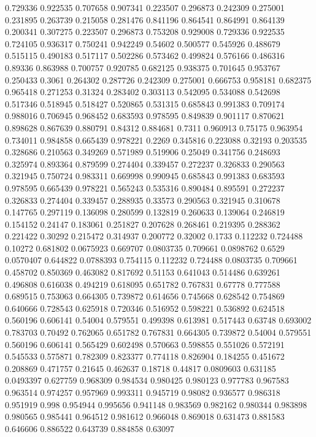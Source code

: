 0.729336 0.922535
0.707658 0.907341
0.223507 0.296873
0.242309 0.275001
0.231895 0.263739
0.215058 0.281476
0.841196 0.864541
0.864991 0.864139
0.200341 0.307275
0.223507 0.296873
0.753208 0.929008
0.729336 0.922535
0.724105 0.936317
0.750241 0.942249
0.54602 0.500577
0.545926 0.488679
0.515115 0.490183
0.517117 0.502286
0.573462 0.499824
0.576166 0.486316
0.89336 0.863988
0.700757 0.920785
0.682125 0.938375
0.701645 0.953767
0.250433 0.3061
0.264302 0.287726
0.242309 0.275001
0.666753 0.958181
0.682375 0.965418
0.271253 0.31324
0.283402 0.303113
0.542095 0.534088
0.542698 0.517346
0.518945 0.518427
0.520865 0.531315
0.685843 0.991383
0.709174 0.988016
0.706945 0.968452
0.683593 0.978595
0.849839 0.901117
0.870621 0.898628
0.867639 0.880791
0.84312 0.884681
0.7311 0.960913
0.75175 0.963954
0.734011 0.984858
0.665439 0.978221
0.2269 0.345816
0.223088 0.32193
0.203535 0.328686
0.210563 0.349269
0.571989 0.519906
0.25049 0.341756
0.248693 0.325974
0.893364 0.879599
0.274404 0.339457
0.272237 0.326833
0.290563 0.321945
0.750724 0.983311
0.669998 0.990945
0.685843 0.991383
0.683593 0.978595
0.665439 0.978221
0.565243 0.535316
0.890484 0.895591
0.272237 0.326833
0.274404 0.339457
0.288935 0.33573
0.290563 0.321945
0.310678 0.147765
0.297119 0.136098
0.280599 0.132819
0.260633 0.139064
0.246819 0.154152
0.24147 0.183061
0.251827 0.207628
0.268461 0.219395
0.288362 0.221422
0.30292 0.215472
0.314937 0.200772
0.32002 0.1733
0.112232 0.724488
0.10272 0.681802
0.0675923 0.669707
0.0803735 0.709661
0.0898762 0.6529
0.0570407 0.644822
0.0788393 0.754115
0.112232 0.724488
0.0803735 0.709661
0.458702 0.850369
0.463082 0.817692
0.51153 0.641043
0.514486 0.639261
0.496808 0.616038
0.494219 0.618095
0.651782 0.767831
0.67778 0.777588
0.689515 0.753063
0.664305 0.739872
0.614656 0.745668
0.628542 0.754869
0.640666 0.728543
0.625918 0.720346
0.516952 0.598221
0.536892 0.624518
0.560196 0.606141
0.54004 0.579551
0.499398 0.613981
0.517443 0.63748
0.693002 0.783703
0.70492 0.762065
0.651782 0.767831
0.664305 0.739872
0.54004 0.579551
0.560196 0.606141
0.565429 0.602498
0.570663 0.598855
0.551026 0.572191
0.545533 0.575871
0.782309 0.823377
0.774118 0.826904
0.184255 0.451672
0.208869 0.471757
0.21645 0.462637
0.18718 0.44817
0.0809603 0.631185
0.0493397 0.627759
0.968309 0.984534
0.980425 0.980123
0.977783 0.967583
0.963514 0.974257
0.957969 0.993311
0.945719 0.98082
0.936577 0.986318
0.951919 0.998
0.954944 0.995656
0.941148 0.983569
0.982162 0.980344
0.983898 0.980565
0.985441 0.964512
0.981612 0.966048
0.869018 0.631473
0.881583 0.646606
0.886522 0.643739
0.884858 0.63097
